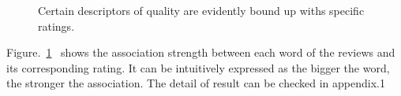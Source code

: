 \documentclass[12pt]{article}%
\begin{document}
\begin{figure}[H]
	\centering
	\caption{Certain descriptors of quality are evidently bound up withs specific ratings.}
	\label{fig2}
\end{figure}
Figure.~\ref{fig2}~ shows the association strength between each word of the reviews and its corresponding rating. It can be intuitively expressed as the bigger the word, the stronger the association. The detail of result can be checked in appendix.1 
\end{document}
